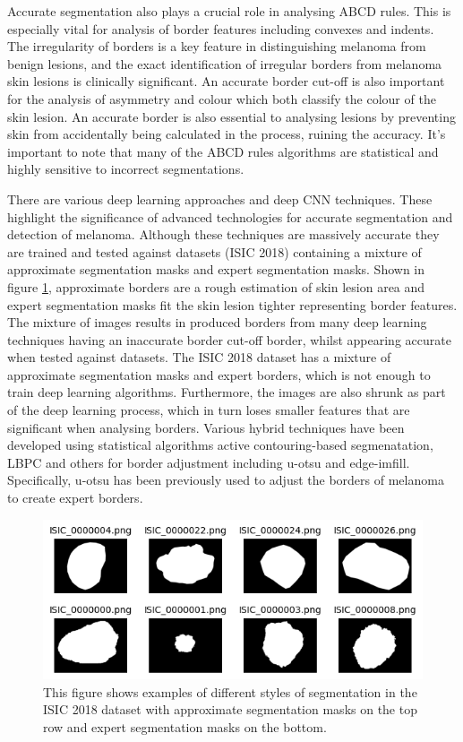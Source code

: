 Accurate segmentation also plays a crucial role in analysing ABCD rules\cite{Lee2020}. This is especially vital for analysis of border features\cite{Pereira2020, Kaya2016} including convexes and indents. The irregularity of borders is a key feature in distinguishing melanoma from benign lesions, and the exact identification of irregular borders from melanoma skin lesions is clinically significant\cite{patil2021}. An accurate border cut-off is also important for the analysis of asymmetry and colour which both classify the colour of the skin lesion. An accurate border is also essential to analysing lesions by preventing skin from accidentally being calculated in the process, ruining the accuracy. It's important to note that many of the ABCD rules algorithms are statistical and highly sensitive to incorrect segmentations.

There are various deep learning approaches\cite{Albahli2020} and deep CNN techniques\cite{yu2017}. These highlight the significance of advanced technologies for accurate segmentation and detection of melanoma. Although these techniques are massively accurate they are trained and tested against datasets (ISIC 2018) containing a mixture of approximate segmentation masks and expert segmentation masks. Shown in figure \ref{seg-expert}, approximate borders are a rough estimation of skin lesion area and expert segmentation masks fit the skin lesion tighter representing border features. The mixture of images results in produced borders from many deep learning techniques having an inaccurate border cut-off border, whilst appearing accurate when tested against datasets. The ISIC 2018 dataset has a mixture of approximate segmentation masks and expert borders, which is not enough to train deep learning algorithms. Furthermore, the images are also shrunk as part of the deep learning process, which in turn loses smaller features that are significant when analysing borders. Various hybrid techniques have been developed using statistical algorithms active contouring-based segmenatation\cite{Riaz2019}, LBPC and others for border adjustment including u-otsu and edge-imfill. Specifically, u-otsu has been previously used to adjust the borders of melanoma to create expert borders\cite{}.

\begin{figure}[]
    \centering
    \includegraphics[scale=1.2]{images/segmentation/seg-expert-approx.png}
    \caption{This figure shows examples of different styles of segmentation in the ISIC 2018 dataset with approximate segmentation masks on the top row and expert segmentation masks on the bottom.}\label{seg-expert}
\end{figure}

